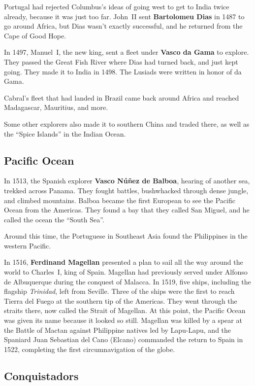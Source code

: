 Portugal had rejected Columbus's ideas of going west to get to India twice already,
because it was just too far.
John~II sent \textbf{Bartolomeu Dias} in 1487 to go around Africa,
but Dias wasn't exactly successful, and he returned from the Cape of Good Hope.

In 1497, Manuel~I, the new king, sent a fleet under \textbf{Vasco da Gama} to explore.
They passed the Great Fish River where Dias had turned back, and just kept going.
They made it to India in 1498.
The Lusiads were written in honor of da Gama.

Cabral's fleet that had landed in Brazil came back around Africa
and reached Madagascar, Mauritius, and more.

Some other explorers also made it to southern China and traded there,
as well as the ``Spice Islands'' in the Indian Ocean.

\subsection*{Pacific Ocean}

In 1513, the Spanish explorer \textbf{Vasco N\'u\~nez de Balboa},
hearing of another sea, trekked across Panama.
They fought battles, bushwhacked through dense jungle, and climbed mountains.
Balboa became the first European to see the Pacific Ocean from the Americas.
They found a bay that they called San Miguel, and he called the ocean the ``South Sea''.

Around this time, the Portuguese in Southeast Asia found the Philippines in the western Pacific.

In 1516, \textbf{Ferdinand Magellan} presented a plan
to sail all the way around the world to Charles~I, king of Spain.
Magellan had previously served under Alfonso de Albuquerque during the conquest of Malacca.
In 1519, five ships, including the flagship \textit{Trinidad}, left from Seville.
Three of the ships were the first to reach Tierra del Fuego at the southern tip of the Americas.
They went through the straits there, now called the Strait of Magellan.
At this point, the Pacific Ocean was given its name because it looked so still.
Magellan was killed by a spear at the Battle of Mactan against Philippine natives led by Lapu-Lapu,
and the Spaniard Juan Sebastian del Cano (Elcano) commanded the return to Spain in 1522,
completing the first circumnavigation of the globe.

\subsection*{Conquistadors}

